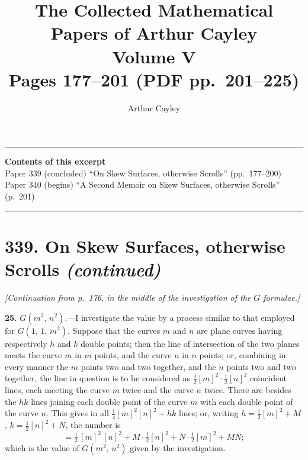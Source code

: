 \documentclass[11pt,a4paper]{article}
\title{\textbf{The Collected Mathematical Papers of Arthur Cayley}\\[6pt]
\Large Volume V\\[12pt]
\large Pages 177--201 \;(PDF pp.\ 201--225)}
\author{Arthur Cayley}
\date{}
\begin{document}
\maketitle
\thispagestyle{empty}

\vspace{1em}
\noindent\rule{\textwidth}{0.4pt}
\vspace{1em}

\begin{center}
\textbf{Contents of this excerpt}\\[4pt]
Paper 339 (concluded) ``On Skew Surfaces, otherwise Scrolls'' (pp.~177--200)\\
Paper 340 (begins) ``A Second Memoir on Skew Surfaces, otherwise Scrolls'' (p.~201)
\end{center}

\noindent\rule{\textwidth}{0.4pt}
\vspace{1em}

\section*{339. On Skew Surfaces, otherwise Scrolls \textit{(continued)}}

\noindent\textit{[Continuation from p.~176, in the middle of the investigation of the $G$ formulae.]}

\medskip

\textbf{25.} $G(m^2,\,n^2)$.---I investigate the value by a process similar to that employed for $G(1,\,1,\,m^2)$. Suppose that the curves $m$ and $n$ are plane curves having respectively $h$ and $k$ double points; then the line of intersection of the two planes meets the curve $m$ in $m$ points, and the curve $n$ in $n$ points; or, combining in every manner the $m$ points two and two together, and the $n$ points two and two together, the line in question is to be considered as $\tfrac{1}{2}[m]^2 \cdot \tfrac{1}{2}[n]^2$ coincident lines, each meeting the curve $m$ twice and the curve $n$ twice. There are besides the $hk$ lines joining each double point of the curve $m$ with each double point of the curve $n$. This gives in all $\tfrac{1}{4}[m]^2 [n]^2 + hk$ lines; or, writing $h = \tfrac{1}{2}[m]^2 + M$, $k = \tfrac{1}{2}[n]^2 + N$, the number is
\[
= \tfrac{1}{2}\,[m]^2\,[n]^2 + M \cdot \tfrac{1}{2}[n]^2 + N \cdot \tfrac{1}{2}[m]^2 + MN;
\]
which is the value of $G(m^2,\,n^2)$ given by the investigation.
\end{document}
